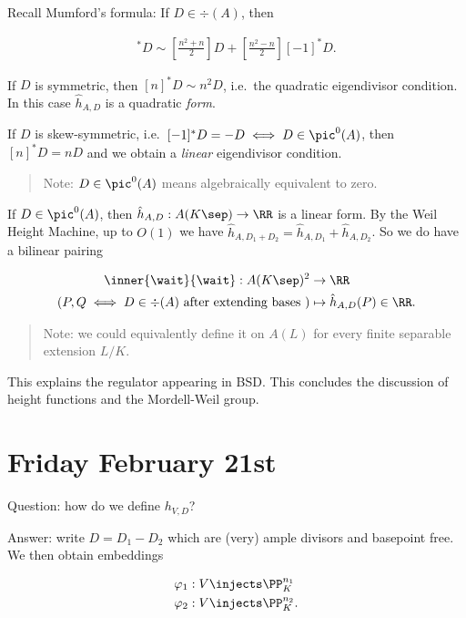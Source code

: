 Recall Mumford's formula: If \(D\in \div(A)\), then

\begin{align*}
[n]^* D \sim \left[ \frac{n^2 + n}{2}\right] D + \left[ \frac{n^2-n}{2}\right] [-1]^* D
.\end{align*}

If \(D\) is symmetric, then \([n]^* D \sim n^2 D\), i.e.~the quadratic
eigendivisor condition. In this case \(\hat h_{A, D}\) is a quadratic
\emph{form}.

If \(D\) is skew-symmetric, i.e.~\([-1]^* D = -D \iff D \in \pic^0(A)\),
then \([n]^* D = nD\) and we obtain a \emph{linear} eigendivisor
condition.

\begin{quote}
Note: \(D\in \pic^0(A)\) means algebraically equivalent to zero.
\end{quote}

If \(D\in \pic^0(A)\), then \(\hat h_{A, D}: A(K\sep)\to \RR\) is a
linear form. By the Weil Height Machine, up to \(O(1)\) we have
\(\hat h_{A, D_1 + D_2} = \hat h_{A, D_1} + \hat h_{A, D_2}\). So we do
have a bilinear pairing

\begin{align*}
\inner{\wait}{\wait}: A(K\sep)^2 &\to \RR \\
(P, Q\iff D\in \div(A) \text{ after extending bases  }) &\mapsto \hat h_{A, D}(P) \in \RR
.\end{align*}

\begin{quote}
Note: we could equivalently define it on \(A(L)\) for every finite
separable extension \(L/K\).
\end{quote}

This explains the regulator appearing in BSD. This concludes the
discussion of height functions and the Mordell-Weil group.

\hypertarget{friday-february-21st}{%
\section{Friday February 21st}\label{friday-february-21st}}

Question: how do we define \(h_{V, D}\)?

Answer: write \(D = D_1 - D_2\) which are (very) ample divisors and
basepoint free. We then obtain embeddings

\begin{align*}
\varphi_1: V &\injects \PP_K^{n_1} \\
\varphi_2: V &\injects \PP_K^{n_2}
.\end{align*}

